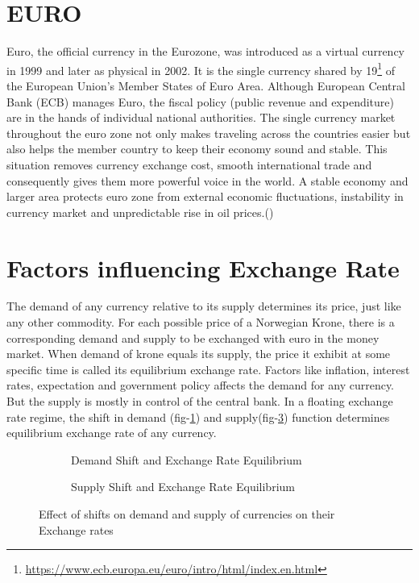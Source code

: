 \documentclass[12pt, lot, lof]{thesis}\usepackage[]{graphicx}\usepackage[]{color}
\begin{document}
\section{EURO}
\label{sec:EuroIntro}
Euro, the official currency in the Eurozone, was introduced as a virtual currency in 1999 and later as physical in 2002. It is the single currency shared by 19\footnote{\url{https://www.ecb.europa.eu/euro/intro/html/index.en.html}} of the European Union's Member States of Euro Area. Although European Central Bank (ECB) manages Euro, the fiscal policy (public revenue and expenditure) are in the hands of individual national authorities. The single currency market throughout the euro zone not only makes traveling across the countries easier but also helps the member country to keep their economy sound and stable. This situation removes currency exchange cost, smooth international trade and consequently gives them more powerful voice in the world. A stable economy and larger area protects euro zone from external economic fluctuations, instability in currency market and unpredictable rise in oil prices.(\cite{euro2015ecb})

\section{Factors influencing Exchange Rate}
\label{sec:AffectingFactors}
	The demand of any currency relative to its supply determines its price, just like any other commodity. For each possible price of a Norwegian Krone, there is a corresponding demand and supply to be exchanged with euro in the money market. When demand of krone equals its supply, the price it exhibit at some specific time is called its equilibrium exchange rate. Factors like inflation, interest rates, expectation and government policy affects the demand for any currency. But the supply is mostly in control of the central bank.  In a floating exchange rate regime, the shift in demand (fig-\ref{fig:demandShift}) and supply(fig-\ref{fig:supplyShift}) function  determines equilibrium exchange rate of any currency.

\begin{figure}[htbp]
\begin{subfigure}[b]{0.5\textwidth}
        
        \caption{Demand Shift and Exchange Rate Equilibrium}
        \label{fig:demandShift}
\end{subfigure}
\begin{subfigure}[b]{0.5\textwidth}
        
        \caption{Supply Shift and Exchange Rate Equilibrium}
        \label{fig:supplyShift}
\end{subfigure}
\caption{Effect of shifts on demand and supply of currencies on their Exchange rates}
\end{figure}
\end{document}

